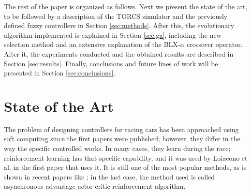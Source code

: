 \documentclass[10pt,journal,compsoc]{IEEEtran}
\begin{document}


The rest of the paper is organized as follows. Next we present the
state of the art, to be followed by a description of the TORCS
simulator and the previously defined fuzzy controllers in Section
\ref{sec:methods}. After this, the evolutionary algorithm implemented
is explained in Section \ref{sec:ga}, including the new selection
method  and an extensive explanation of the BLX-$\alpha$ crossover
operator. After it, the 
experiments conducted and the obtained results are described in
Section \ref{sec:results}. Finally, conclusions and future lines of
work will be presented in Section \ref{sec:conclusions}. 


\section{State of the Art}
\label{sec:soa}



The problem of designing controllers for racing cars has been
approached using soft computing since the first papers were
published; however, they differ in the way the specific controlled
works. In many cases, they learn during the race; reinforcement
learning has that specific capability, and it was used by Loiacono et
al. \cite{loiacono2010learning} in the first paper that uses it. It is still one of the most popular methods, as is shown
in recent papers like \cite{giani2019desing,remondaformula,waghdistributed}; in the last
case, the method used is called asynchronous advantage actor-critic
reinforcement algorithm.
\end{document}
